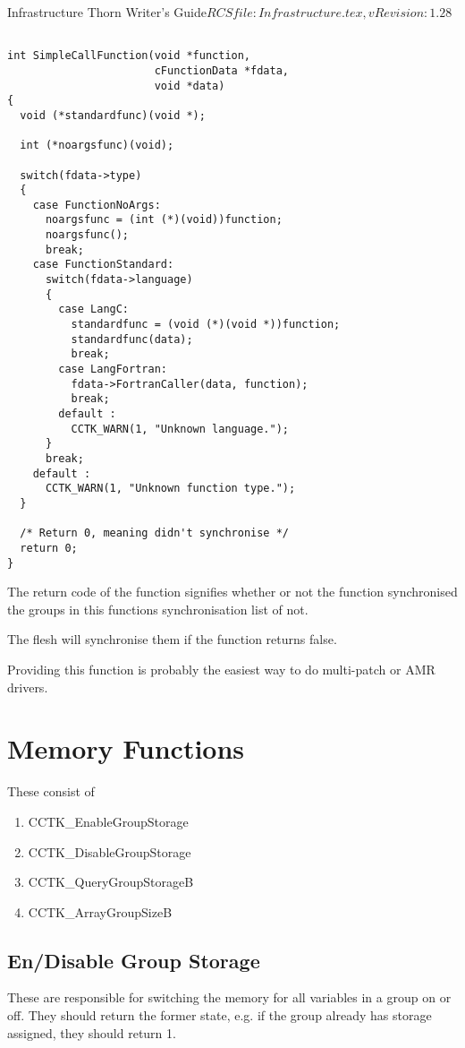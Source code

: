 \begin{cactuspart}{4}{Infrastructure Thorn Writer's Guide}{$RCSfile: Infrastructure.tex,v $}{$Revision: 1.28 $}
\begin{verbatim}

int SimpleCallFunction(void *function, 
                       cFunctionData *fdata, 
                       void *data)
{
  void (*standardfunc)(void *);

  int (*noargsfunc)(void);

  switch(fdata->type)
  {
    case FunctionNoArgs:
      noargsfunc = (int (*)(void))function;
      noargsfunc();
      break;
    case FunctionStandard:
      switch(fdata->language)
      {
        case LangC:
          standardfunc = (void (*)(void *))function;
          standardfunc(data);
          break;
        case LangFortran:
          fdata->FortranCaller(data, function);
          break;
        default :
          CCTK_WARN(1, "Unknown language.");
      }
      break;
    default :
      CCTK_WARN(1, "Unknown function type.");
  }

  /* Return 0, meaning didn't synchronise */
  return 0;
}

\end{verbatim}

The return code of the function signifies whether or not the function
synchronised the groups in this functions synchronisation list of not.

The flesh will synchronise them if the function returns false.

Providing this function is probably the easiest way to do multi-patch or
AMR drivers.

\section{Memory Functions}

These consist of 
\begin{enumerate}
\item{} CCTK\_EnableGroupStorage
\item{} CCTK\_DisableGroupStorage
\item{} CCTK\_QueryGroupStorageB
\item{} CCTK\_ArrayGroupSizeB
\end{enumerate}

\subsection{En/Disable Group Storage}

These are responsible for switching the memory for all variables
in a group on or off.  They should return the former state, e.g.
if the group already has storage assigned, they should return 1.


\end{cactuspart}
